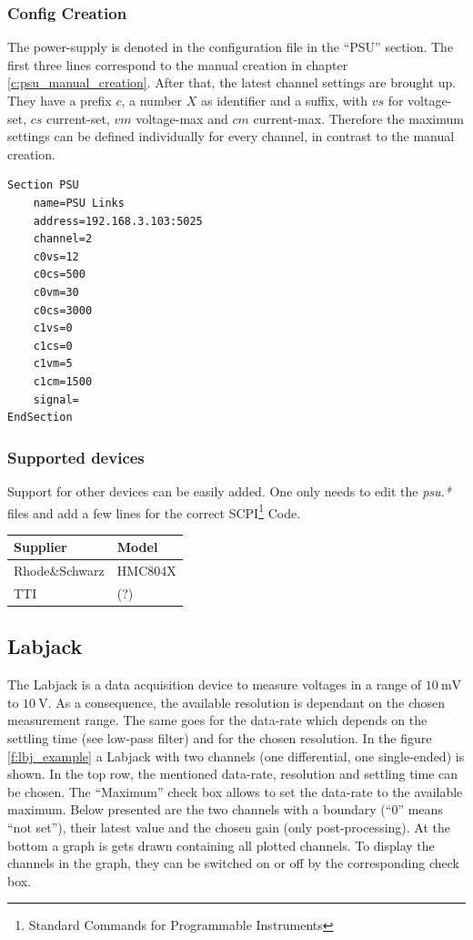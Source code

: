 \documentclass[10pt,a4paper]{article}
\begin{document}
	\subsubsection{Config Creation}
	
	The power-supply is denoted in the configuration file in the \enquote{PSU} section. The first three lines correspond to the manual creation in chapter \ref{c:psu_manual_creation}. After that, the latest channel settings are brought up. They have a prefix $c$, a number $X$ as identifier and a suffix, with $vs$ for voltage-set, $cs$ current-set, $vm$ voltage-max and $cm$ current-max. Therefore the maximum settings can be defined individually for every channel, in contrast to the manual creation.
	
\begin{lstlisting}[caption=PSU Config]
Section PSU
	name=PSU Links
	address=192.168.3.103:5025
	channel=2
	c0vs=12
	c0cs=500
	c0vm=30
	c0cs=3000
	c1vs=0
	c1cs=0
	c1vm=5
	c1cm=1500
	signal=
EndSection
\end{lstlisting}
	
		\subsubsection{Supported devices}
		Support for other devices can be easily added. One only needs to edit the \textit{psu.*} files and add a few lines for the correct SCPI\footnote{Standard Commands for Programmable Instruments} Code.
	
		\begin{table}[H]
		\centering
		\begin{tabular}{ll}
		\toprule
		Supplier			& Model \\ \midrule
		Rhode\&Schwarz		& HMC804X \\
		TTI					& (?) \\
		\bottomrule
		\end{tabular}			
		\end{table}	
		
\newpage
	
	\subsection{Labjack}
	The Labjack is a data acquisition device to measure voltages in a range of $\SI{10}{\milli\volt}$ to $\SI{10}{\volt}$. As a consequence, the available resolution is dependant on the chosen measurement range. The same goes for the data-rate which depends on the settling time (see low-pass filter) and for the chosen resolution. In the figure \eqref{f:lbj_example} a Labjack with two channels (one differential, one single-ended) is shown. In the top row, the mentioned data-rate, resolution and settling time can be chosen. The \enquote{Maximum} check box allows to set the data-rate to the available maximum. Below presented are the two channels with a boundary (\enquote{0} means \enquote{not set}), their latest value and the chosen gain (only post-processing). At the bottom a graph is gets drawn containing all plotted channels. To display the channels in the graph, they can be switched on or off by the corresponding check box. 
	
\end{document}
